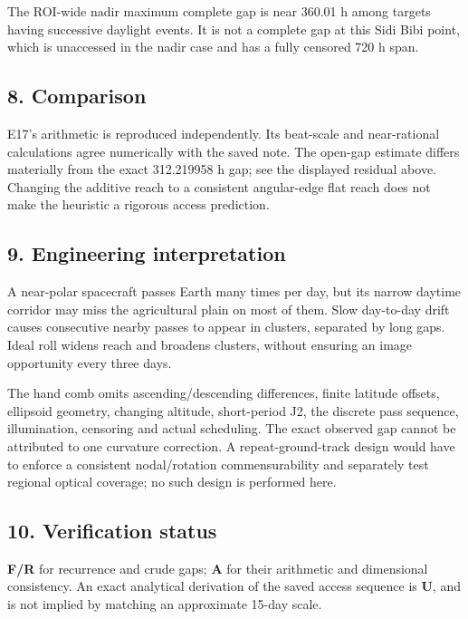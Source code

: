\documentclass[10pt,a4paper]{article}
\numberwithin{equation}{section}
\begin{document}
\begin{sloppypar}The ROI-wide nadir maximum complete gap is near 360.01 h among targets having successive daylight events. It is not a complete gap at this Sidi Bibi point, which is unaccessed in the nadir case and has a fully censored 720 h span.\end{sloppypar}


\subsection*{8. Comparison}
\begin{sloppypar}E17's arithmetic is reproduced independently. Its beat-scale and near-rational calculations agree numerically with the saved note. The open-gap estimate differs materially from the exact 312.219958 h gap; see the displayed residual above. Changing the additive reach to a consistent angular-edge flat reach does not make the heuristic a rigorous access prediction.\end{sloppypar}


\subsection*{9. Engineering interpretation}
\begin{sloppypar}A near-polar spacecraft passes Earth many times per day, but its narrow daytime corridor may miss the agricultural plain on most of them. Slow day-to-day drift causes consecutive nearby passes to appear in clusters, separated by long gaps. Ideal roll widens reach and broadens clusters, without ensuring an image opportunity every three days.\end{sloppypar}


\begin{sloppypar}The hand comb omits ascending/descending differences, finite latitude offsets, ellipsoid geometry, changing altitude, short-period J2, the discrete pass sequence, illumination, censoring and actual scheduling. The exact observed gap cannot be attributed to one curvature correction. A repeat-ground-track design would have to enforce a consistent nodal/rotation commensurability and separately test regional optical coverage; no such design is performed here.\end{sloppypar}


\subsection*{10. Verification status}
\begin{sloppypar}\textbf{F/R} for recurrence and crude gaps; \textbf{A} for their arithmetic and dimensional consistency. An exact analytical derivation of the saved access sequence is \textbf{U}, and is not implied by matching an approximate 15-day scale.\end{sloppypar}
\end{document}
